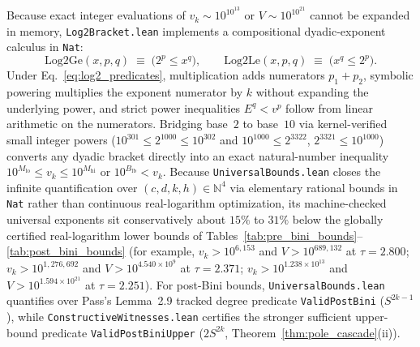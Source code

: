 \documentclass[11pt,a4paper]{article}
\theoremstyle{plain}
\theoremstyle{definition}
\theoremstyle{remark}
\newcommand{\N}{\mathbb{N}}
\begin{document}
Because exact integer evaluations of $v_k \sim 10^{10^{13}}$ or $V \sim 10^{10^{21}}$ cannot be expanded in memory, \texttt{Log2Bracket.lean} implements a compositional dyadic-exponent calculus in \texttt{Nat}:
\begin{equation}
    \mathrm{Log2Ge}(x, p, q) \;\equiv\; \bigl(2^p \le x^q\bigr), \qquad \mathrm{Log2Le}(x, p, q) \;\equiv\; \bigl(x^q \le 2^p\bigr) .
    \label{eq:log2_predicates}
\end{equation}
Under Eq.~\eqref{eq:log2_predicates}, multiplication adds numerators $p_1 + p_2$, symbolic powering multiplies the exponent numerator by $k$ without expanding the underlying power, and strict power inequalities $E^q < v^p$ follow from linear arithmetic on the numerators. Bridging base~$2$ to base~$10$ via kernel-verified small integer powers ($10^{301} \le 2^{1000} \le 10^{302}$ and $10^{1000} \le 2^{3322}$, $2^{3321} \le 10^{1000}$) converts any dyadic bracket directly into an exact natural-number inequality $10^{M_{\mathrm{lo}}} \le v_k \le 10^{M_{\mathrm{hi}}}$ or $10^{B_{\mathrm{lb}}} < v_k$. Because \texttt{UniversalBounds.lean} closes the infinite quantification over $(c, d, k, h) \in \N^4$ via elementary rational bounds in \texttt{Nat} rather than continuous real-logarithm optimization, its machine-checked universal exponents sit conservatively about $15\%$ to $31\%$ below the globally certified real-logarithm lower bounds of Tables~\ref{tab:pre_bini_bounds}--\ref{tab:post_bini_bounds} (for example, $v_k > 10^{6{,}153}$ and $V > 10^{689{,}132}$ at $\tau = 2.800$; $v_k > 10^{1{,}276{,}692}$ and $V > 10^{4.540 \times 10^9}$ at $\tau = 2.371$; $v_k > 10^{1.238 \times 10^{13}}$ and $V > 10^{1.594 \times 10^{21}}$ at $\tau = 2.251$). For post-Bini bounds, \texttt{UniversalBounds.lean} quantifies over Pass's Lemma~2.9 tracked degree predicate \texttt{ValidPostBini} ($S^{2k-1}$), while \texttt{ConstructiveWitnesses.lean} certifies the stronger sufficient upper-bound predicate \texttt{ValidPostBiniUpper} ($2 S^{2k}$, Theorem~\ref{thm:pole_cascade}(ii)).
\end{document}
